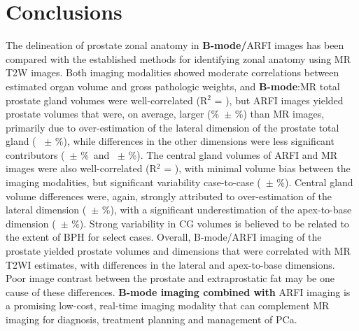 \section{Conclusions}
The delineation of prostate zonal anatomy in \textbf{B-mode/}ARFI images has
been compared with the established methods for identifying zonal anatomy using
MR T2W images.  Both imaging modalities showed moderate correlations between
estimated organ volume and gross pathologic weights, and \textbf{B-mode}:MR
total prostate gland volumes were well-correlated (R$^2$ = \MRarfiVolTotalRsq),
but ARFI images yielded prostate volumes that were, on average, larger
(\MRarfiVolTotalMeanDiff\%~$\pm$ \MRarfiVolTotalStdDiff\%) than MR images,
primarily due to over-estimation of the lateral dimension of the prostate total
gland (\ARFImrTotalLatLatMeanPct~ $\pm$ \ARFImrTotalLatLatStdPct\%), while
differences in the other dimensions were less significant contributors
(\ARFImrTotalAntPostMeanPct~$\pm$ \ARFImrTotalAntPostStdPct\%~and
\ARFImrTotalApexBaseMeanPct~$\pm$ \ARFImrTotalApexBaseStdPct\%).  The central
gland volumes of ARFI and MR images were also well-correlated (R$^2$ =
\MRarfiVolCentralRsq), with minimal volume bias between the imaging modalities,
but significant variability case-to-case (\MRarfiVolCentralMeanDiff~$\pm$
\MRarfiVolCentralStdDiff\%).  Central gland volume differences were, again,
strongly attributed to over-estimation of the lateral dimension
(\ARFImrCentralLatLatMeanPct~$\pm$ \ARFImrCentralLatLatStdPct\%), with a
significant underestimation of the apex-to-base dimension
(\ARFImrCentralAntPostMeanPct~$\pm$ \ARFImrCentralAntPostStdPct\%).  Strong
variability in CG volumes is believed to be related to the extent of BPH for
select cases.  Overall, B-mode/ARFI imaging of the prostate yielded prostate
volumes and dimensions that were correlated with MR T2WI estimates, with
differences in the lateral and apex-to-base dimensions.  Poor image contrast
between the prostate and extraprostatic fat may be one cause of these
differences.  \textbf{B-mode imaging combined with} ARFI imaging is a promising
low-cost, real-time imaging modality that can complement MR imaging for
diagnosis, treatment planning and management of PCa.
